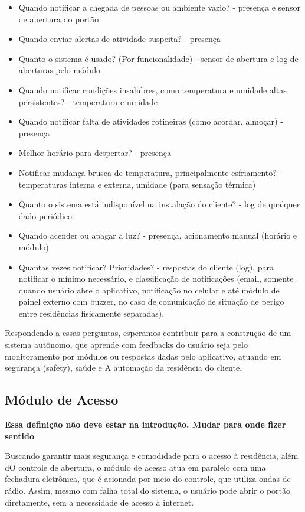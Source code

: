 \begin{itemize}
	
\item Quando notificar a chegada de pessoas ou ambiente vazio? - presença e sensor de abertura do portão
\item Quando enviar alertas de atividade suspeita? - presença
\item Quanto o sistema é usado? (Por funcionalidade) - sensor de abertura e log de aberturas pelo módulo
\item Quando notificar condições insalubres, como temperatura e umidade altas persistentes? - temperatura e umidade
\item Quando notificar falta de atividades rotineiras (como acordar, almoçar) - presença
\item Melhor horário para despertar? - presença
\item Notificar mudança brusca de temperatura, principalmente esfriamento? - temperaturas interna e externa, umidade (para sensação térmica)
\item Quanto o sistema está indisponível na instalação do cliente? - log de qualquer dado periódico
\item Quando acender ou apagar a luz? - presença, acionamento manual (horário e módulo)
\item Quantas vezes notificar? Prioridades? - respostas do cliente (log), para notificar o mínimo necessário, e classificação de notificações (email, somente quando usuário abre o aplicativo, notificação no celular e até módulo de painel externo com buzzer, no caso de comunicação de situação de perigo entre residências fisicamente separadas).
\end{itemize}

Respondendo a essas perguntas, esperamos contribuir para a construção de um sistema autônomo, que aprende com feedbacks do usuário seja pelo monitoramento por módulos ou respostas dadas pelo aplicativo, atuando em segurança (safety), saúde e A
automação da residência do cliente.

\subsection{Módulo de Acesso}

\textbf{Essa definição não deve estar na introdução. Mudar para onde fizer sentido}

Buscando garantir mais segurança e comodidade para o acesso à residência, além dO controle de abertura, o módulo de acesso atua em paralelo com uma fechadura eletrônica, que é acionada por meio do controle, que utiliza ondas de rádio. Assim, mesmo com falha total do sistema, o usuário pode abrir o portão diretamente, sem a necessidade de acesso à internet.

